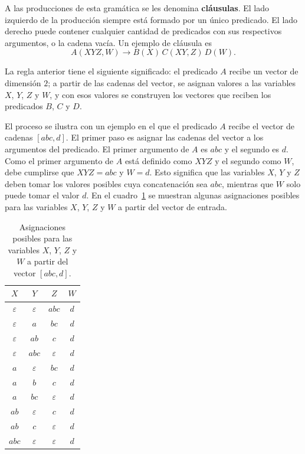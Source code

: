 A las producciones de esta gramática se les denomina \textbf{cláusulas}.
El lado izquierdo de la producción siempre está formado por un único
predicado. El lado derecho puede contener cualquier cantidad de
predicados con sus respectivos argumentos, o la cadena vacía. Un ejemplo
de cláusula es
\[
  A(XYZ, W) \to B(X)\, C(XY, Z)\, D(W).
\]

La regla anterior tiene el siguiente significado: el predicado $A$
recibe un vector de dimensión $2$; a partir de las cadenas del vector,
se asignan valores a las variables $X$, $Y$, $Z$ y $W$, y con esos
valores se construyen los vectores que reciben los predicados $B$, $C$
y $D$.

El proceso se ilustra con un ejemplo en el que el predicado $A$ recibe
el vector de cadenas $[abc, d]$. El primer paso es asignar las cadenas
del vector a los argumentos del predicado. El primer argumento de $A$
es $abc$ y el segundo es $d$. Como el primer argumento de $A$ está
definido como $XYZ$ y el segundo como $W$, debe cumplirse que $XYZ = abc$
y $W = d$. Esto significa que las variables $X$, $Y$ y $Z$ deben tomar
los valores posibles cuya concatenación sea $abc$, mientras que $W$ solo
puede tomar el valor $d$. En el cuadro~\ref{tab:valores-xyzw} se
muestran algunas asignaciones posibles para las variables $X$, $Y$, $Z$
y $W$ a partir del vector de entrada.

\begin{table}[ht]
  \centering
  \begin{tabular}{|c|c|c|c|}
    \hline
    $X$ & $Y$ & $Z$ & $W$ \\ \hline
    $\varepsilon$ & $\varepsilon$ & $abc$ & $d$ \\ \hline
    $\varepsilon$ & $a$ & $bc$ & $d$ \\ \hline
    $\varepsilon$ & $ab$ & $c$ & $d$ \\ \hline
    $\varepsilon$ & $abc$ & $\varepsilon$ & $d$ \\ \hline
    $a$ & $\varepsilon$ & $bc$ & $d$ \\ \hline
    $a$ & $b$ & $c$ & $d$ \\ \hline
    $a$ & $bc$ & $\varepsilon$ & $d$ \\ \hline
    $ab$ & $\varepsilon$ & $c$ & $d$ \\ \hline
    $ab$ & $c$ & $\varepsilon$ & $d$ \\ \hline
    $abc$ & $\varepsilon$ & $\varepsilon$ & $d$ \\ \hline
  \end{tabular}
  \caption{Asignaciones posibles para las variables $X$, $Y$, $Z$ y
  $W$ a partir del vector $[abc, d]$.}
  \label{tab:valores-xyzw}
\end{table}

